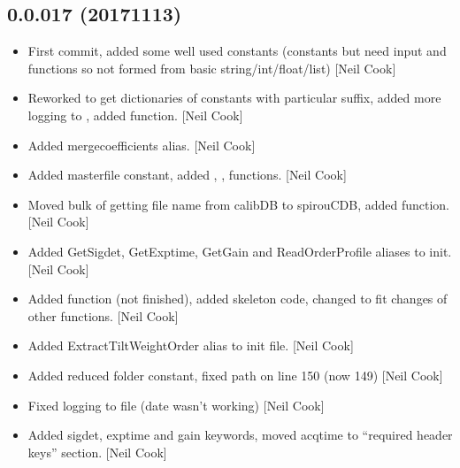 \documentclass[a4paper,10pt,english]{report}
\begin{document}
\subsection{0.0.017 (2017\sphinxhyphen{}11\sphinxhyphen{}13)}
\label{\detokenize{misc/changelog:id552}}\begin{itemize}
\item {} 
First commit, added some well used constants (constants but need input
and functions so not formed from basic string/int/float/list) {[}Neil
Cook{]}

\item {} 
Reworked  to get dictionaries of constants with particular
suffix, added more logging to , added
 function. {[}Neil Cook{]}

\item {} 
Added mergecoefficients alias. {[}Neil Cook{]}

\item {} 
Added masterfile constant, added , , 
functions. {[}Neil Cook{]}

\item {} 
Moved bulk of getting file name from calibDB to spirouCDB, added
 function. {[}Neil Cook{]}

\item {} 
Added GetSigdet, GetExptime, GetGain and ReadOrderProfile aliases to
init. {[}Neil Cook{]}

\item {} 
Added  function (not finished), added
 skeleton code, changed  to fit
changes of other functions. {[}Neil Cook{]}

\item {} 
Added ExtractTiltWeightOrder alias to init file. {[}Neil Cook{]}

\item {} 
Added reduced folder constant, fixed  path on line 150 (now
149) {[}Neil Cook{]}

\item {} 
Fixed logging to file (date wasn’t working) {[}Neil Cook{]}

\item {} 
Added sigdet, exptime and gain keywords, moved acqtime to “required
header keys” section. {[}Neil Cook{]}


\end{itemize}
\end{document}

